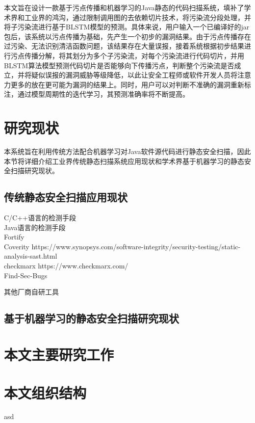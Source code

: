 本文旨在设计一款基于污点传播和机器学习的Java静态的代码扫描系统，填补了学术界和工业界的鸿沟，通过限制调用图的去依赖切片技术，将污染流分段处理，并将子污染流进行基于BLSTM模型的预测。具体来说，用户输入一个已编译好的jar包后，该系统以污点传播为基础，先产生一个初步的漏洞结果。由于污点传播存在过污染、无法识别清洁函数问题，该结果存在大量误报，接着系统根据初步结果进行污点传播分解，将其划分为多个子污染流，对每个污染流进行代码切片，并用BLSTM算法模型预测代码切片是否能够向下传播污点，判断整个污染流是否成立，并将疑似误报的漏洞威胁等级降低，以此让安全工程师或软件开发人员将注意力更多的放在更可能为漏洞的结果上。同时，用户可以对判断不准确的漏洞重新标注，通过模型周期性的迭代学习，其预测准确率将不断提高。

\section{研究现状}
本系统旨在利用传统方法配合机器学习对Java软件源代码进行静态安全扫描，因此本节将详细介绍工业界传统静态扫描系统应用现状和学术界基于机器学习的静态安全扫描研究现状。\\

\subsection{传统静态安全扫描应用现状}
C/C++语言的检测手段\\
Java语言的检测手段\\
Fortify\\

Coverity https://www.synopsys.com/software-integrity/security-testing/static-analysis-sast.html\\
checkmarx https://www.checkmarx.com/\\
Find-Sec-Bugs

其他厂商自研工具

\subsection{基于机器学习的静态安全扫描研究现状}

\section{本文主要研究工作}


\section{本文组织结构}
asd